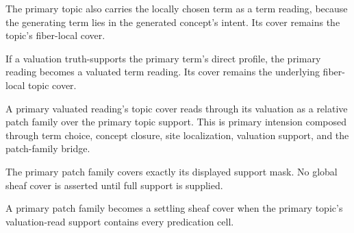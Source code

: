 \begin{theorem}\label{thm:claim-primary-reading-cover}\leanok{}
The primary topic also carries the locally chosen term as a term reading, because
the generating term lies in the generated concept's intent.  Its cover remains
the topic's fiber-local cover.
\end{theorem}

\begin{theorem}\label{thm:claim-primary-valuated-reading-cover}\leanok{}
If a valuation truth-supports the primary term's direct profile, the primary
reading becomes a valuated term reading.  Its cover remains the underlying
fiber-local topic cover.
\end{theorem}

\begin{proposition}\label{thm:claim-primary-patch-family}\leanok{}
A primary valuated reading's topic cover reads through its valuation as a
relative patch family over the primary topic support.  This is primary intension
composed through term choice, concept closure, site localization, valuation
support, and the patch-family bridge.
\end{proposition}

\begin{theorem}\label{thm:claim-primary-patch-family-covers-support}\leanok{}
The primary patch family covers exactly its displayed support mask.  No global
sheaf cover is asserted until full support is supplied.
\end{theorem}

\begin{proposition}\label{thm:claim-primary-sheaf-cover}\leanok{}
A primary patch family becomes a settling sheaf cover when the primary topic's
valuation-read support contains every predication cell.
\end{proposition}

